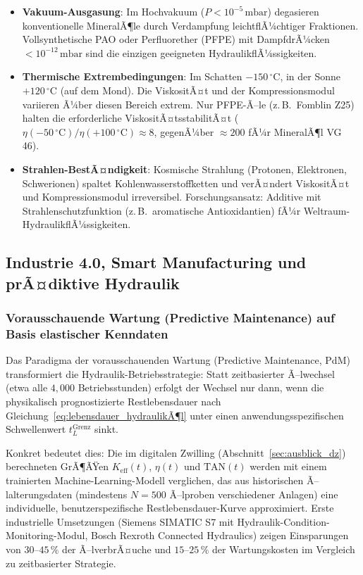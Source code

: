 ﻿\documentclass[a4paper,12pt]{scrreprt}
\theoremstyle{definition}
\begin{document}
\begin{itemize}
  \item \textbf{Vakuum-Ausgasung}: Im Hochvakuum ($P < 10^{-5}\,\mathrm{mbar}$)
    degasieren konventionelle MineralÃ¶le durch Verdampfung leicht\-flÃ¼chtiger
    Fraktionen. Vollsynthetische PAO oder Perfluorether (PFPE)
    mit DampfdrÃ¼cken $< 10^{-12}\,\mathrm{mbar}$ sind die einzigen
    geeigneten HydraulikflÃ¼ssigkeiten.
  \item \textbf{Thermische Extrembedingungen}: Im Schatten $-150\,{^\circ}\mathrm{C}$,
    in der Sonne $+120\,{^\circ}\mathrm{C}$ (auf dem Mond). Die ViskositÃ¤t
    und der Kompressionsmodul variieren Ã¼ber diesen Bereich extrem.
    Nur PFPE-Ã–le (z.\,B.\ Fomblin Z25) halten die erforderliche
    ViskositÃ¤tsstabilitÃ¤t ($\eta(-50\,{^\circ}\mathrm{C}) / \eta(+100\,{^\circ}\mathrm{C})
    \approx 8$, gegenÃ¼ber $\approx 200$ fÃ¼r MineralÃ¶l VG 46).
  \item \textbf{Strahlen-BestÃ¤ndigkeit}: Kosmische Strahlung
    (Protonen, Elektronen, Schwerionen) spaltet Kohlenwasserstoffketten
    und verÃ¤ndert ViskositÃ¤t und Kompressionsmodul irreversibel.
    Forschungsansatz: Additive mit Strahlenschutzfunktion (z.\,B.\ aromatische
    Antioxidantien) fÃ¼r Weltraum-HydraulikflÃ¼ssigkeiten.
\end{itemize}

\subsection{Industrie 4.0, Smart Manufacturing und prÃ¤diktive Hydraulik}

\subsubsection{Vorausschauende Wartung (Predictive Maintenance) auf Basis elastischer Kenndaten}

Das Paradigma der vorausschauenden Wartung (Predictive Maintenance,
PdM) transformiert die Hydraulik-Betriebsstrategie: Statt zeit\-basierter
Ã–lwechsel (etwa alle $4{,}000$ Betriebsstunden) erfolgt der
Wechsel nur dann, wenn die physikalisch prognostizierte Restlebensdauer
nach Gleichung~\eqref{eq:lebensdauer_hydraulikÃ¶l} unter einen
anwendungsspezifischen Schwellenwert $t_L^{\mathrm{Grenz}}$ sinkt.

Konkret bedeutet dies: Die im digitalen Zwilling (Abschnitt~\ref{sec:ausblick_dz})
berechneten GrÃ¶ÃŸen $K_{\mathrm{eff}}(t)$, $\eta(t)$ und $\mathrm{TAN}(t)$
werden mit einem trainierten Machine-Learning-Modell verglichen, das
aus historischen Ã–lalterungsdaten (mindestens $N = 500$ Ã–lproben
verschiedener Anlagen) eine individuelle, benutzerspezifische
Restlebensdauer-Kurve approximiert. Erste industrielle Umsetzungen
(Siemens SIMATIC S7 mit Hydraulik-Condition-Monitoring-Modul,
Bosch Rexroth Connected Hydraulics) zeigen Einsparungen von
$30$--$45\,\%$ der Ã–lverbrÃ¤uche und $15$--$25\,\%$ der Wartungskosten
im Vergleich zu zeitbasierter Strategie.
\end{document}
